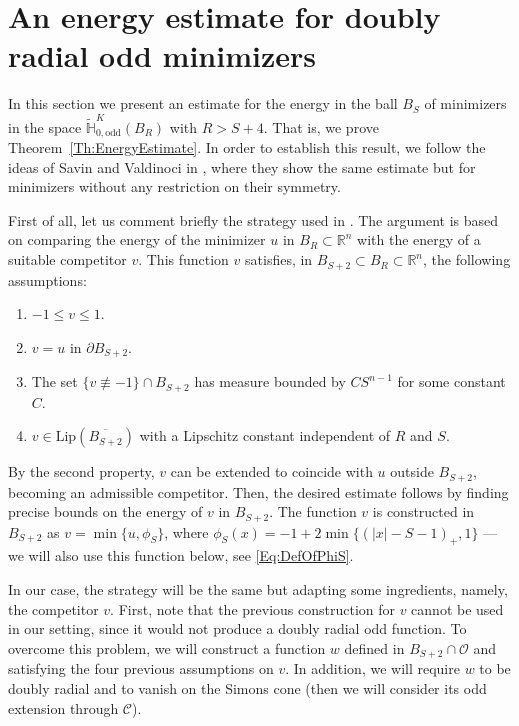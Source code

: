 \documentclass[12pt,reqno]{amsart}
\theoremstyle{definition}
\theoremstyle{remark}
\newcommand{\con}[1]{\mathbb{#1}}
\newcommand{\R}{\con{R}} %
\renewcommand{\H}{\con{H}}
\newcommand{\ccal}{\mathscr{C}}
\newcommand{\ocal}{\mathcal{O}}
\newcommand{\Lip}{\mathrm{Lip}}
\numberwithin{equation}{section}
\begin{document}
	
	\section{An energy estimate for doubly radial odd minimizers}
	\label{Sec:EnergyEstimate}
	
	In this section we present an estimate for the energy in the ball $B_S$ of minimizers in the space $\widetilde{\H}^K_{0, \mathrm{odd}}(B_R)$ with $R > S+ 4$. That is, we prove Theorem~\ref{Th:EnergyEstimate}. In order to establish this result, we follow the ideas of Savin and Valdinoci in \cite{SavinValdinoci-EnergyEstimate}, where they show the same estimate but for minimizers without any restriction on their symmetry.
	
	
	First of all, let us comment briefly the strategy used in \cite{SavinValdinoci-EnergyEstimate}. The argument is based on comparing the energy of the minimizer $u$ in $B_R\subset \R^n$ with the energy of a suitable competitor $v$. This function $v$ satisfies, in $B_{S+2}\subset B_R \subset \R^n$, the following assumptions:
	\begin{enumerate}[label=(\textit{\roman*})]
		\item $-1 \leq v \leq 1$.
		\item $v=u$ in $\partial B_{S+2}$.
		\item The set $\{v\not \equiv -1\}\cap B_{S+2}$ has measure bounded by $C S^{n-1}$ for some constant $C$.
		\item $v\in \Lip(\overline{B_{S+2}})$ with a Lipschitz constant independent of $R$ and $S$.
	\end{enumerate} 
	By the second property, $v$ can be extended to coincide with $u$ outside $B_{S+2}$, becoming an admissible competitor. Then, the desired estimate follows by finding precise bounds on the energy of $v$ in $B_{S+2}$. The function $v$ is constructed in $B_{S+2}$ as $v = \min \{u, \phi_S\}$, where $\phi_S (x) =-1+2\min\{(|x|-S-1)_+,1\}$ ---we will also use this function below, see \eqref{Eq:DefOfPhiS}.
	
	In our case, the strategy will be the same but adapting some ingredients, namely, the competitor $v$. First, note that the previous construction for $v$ cannot be used in our setting, since it would not produce a doubly radial odd function. To overcome this problem, we will construct a function $w$ defined in $B_{S+2}\cap \ocal$ and satisfying the four previous assumptions on $v$. In addition, we will require $w$ to be doubly radial and to vanish on the Simons cone (then we will consider its odd extension through $\ccal$).
	
\end{document}
